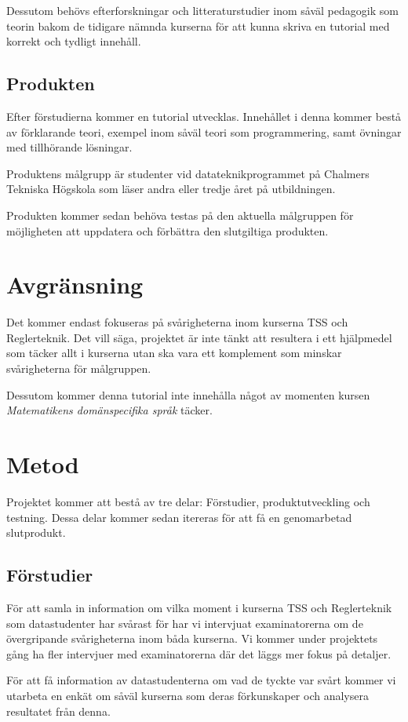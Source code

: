 \documentclass{article}
\begin{document}
Dessutom behövs efterforskningar och litteraturstudier
inom såväl pedagogik som teorin bakom de tidigare
nämnda kurserna för att kunna skriva en tutorial
med korrekt och tydligt innehåll.

\subsection{Produkten}
Efter förstudierna kommer en tutorial utvecklas.
Innehållet i denna kommer bestå av förklarande
teori, exempel inom såväl teori som programmering,
samt övningar med tillhörande lösningar.

Produktens målgrupp är studenter vid datateknikprogrammet på
Chalmers Tekniska Högskola som läser andra eller tredje året på utbildningen.

Produkten kommer sedan behöva testas på den aktuella målgruppen för
möjligheten att uppdatera och förbättra den slutgiltiga produkten.

\section{Avgränsning}

Det kommer endast fokuseras på svårigheterna inom kurserna
TSS och Reglerteknik. Det vill säga, projektet är inte tänkt
att resultera i ett hjälpmedel som täcker allt i kurserna
utan ska vara ett komplement som minskar svårigheterna för målgruppen.

Dessutom kommer denna tutorial inte innehålla något av momenten kursen \textit{Matematikens domänspecifika språk} täcker.

\newpage
\section{Metod}
Projektet kommer att bestå av tre delar: Förstudier,
produktutveckling och testning. Dessa delar kommer
sedan itereras för att få en genomarbetad slutprodukt.

\subsection{Förstudier}
För att samla in information om vilka moment i kurserna
TSS och Reglerteknik som datastudenter har svårast för har
vi intervjuat examinatorerna om de övergripande
svårigheterna inom båda kurserna.
Vi kommer under projektets gång ha fler intervjuer med
examinatorerna där det läggs mer fokus på detaljer.

För att få information av datastudenterna om vad de tyckte
var svårt kommer vi utarbeta en enkät om såväl kurserna
som deras förkunskaper och analysera resultatet från denna.
\end{document}
